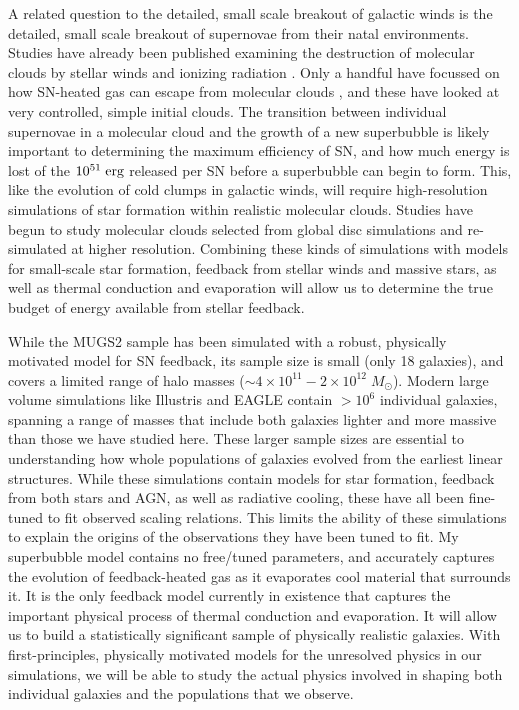 A related question to the detailed, small scale breakout of galactic winds is
the detailed, small scale breakout of supernovae from their natal environments.
Studies have already been published examining the destruction of molecular
clouds by stellar winds and ionizing radiation \citep{Murray2010,Walch2012}.
Only a handful have focussed on how SN-heated gas can escape from molecular
clouds \citep{Rogers2013}, and these have looked at very controlled, simple
initial clouds.  The transition between individual supernovae in a molecular
cloud and the growth of a new superbubble is likely important to determining the
maximum efficiency of SN, and how much energy is lost of the $10^{51}\;\rm{erg}$
released per SN before a superbubble can begin to form.  This, like the
evolution of cold clumps in galactic winds, will require high-resolution
simulations of star formation within realistic molecular clouds.  Studies have
begun \citep{Dobbs2015} to study molecular clouds selected from global disc
simulations and re-simulated at higher resolution.  Combining these kinds of
simulations with models for small-scale star formation, feedback from stellar
winds and massive stars, as well as thermal conduction and evaporation will
allow us to determine the true budget of energy available from stellar feedback.

While the MUGS2 sample has been simulated with a robust, physically motivated
model for SN feedback, its sample size is small (only 18 galaxies), and covers a
limited range of halo masses ($\sim 4\times10^{11}-2\times10^{12}\;M_\odot$).
Modern large volume simulations like Illustris \citep{Vogelsberger2014b} and
EAGLE \citep{Schaye2015} contain $>10^6$ individual galaxies, spanning a range
of masses that include both galaxies lighter and more massive than those we have
studied here.  These larger sample sizes are essential to understanding how
whole populations of galaxies evolved from the earliest linear structures.
While these simulations contain models for star formation, feedback from both
stars and AGN, as well as radiative cooling, these have all been fine-tuned to
fit observed scaling relations.  This limits the ability of these simulations to
explain the origins of the observations they have been tuned to fit.  My
superbubble model contains no free/tuned parameters, and accurately captures the
evolution of feedback-heated gas as it evaporates cool material that surrounds
it.  It is the only feedback model currently in existence that captures the
important physical process of thermal conduction and evaporation.  It will allow
us to build a statistically significant sample of physically realistic galaxies.
With first-principles, physically motivated models for the unresolved physics in
our simulations, we will be able to study the actual physics involved in shaping
both individual galaxies and the populations that we observe. 


